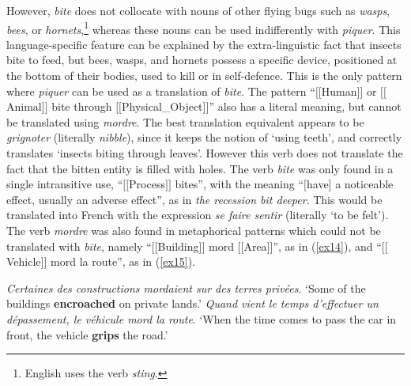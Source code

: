 \documentclass[output=paper]{langsci/langscibook}
\begin{document}
However, \textit{bite} does not collocate with nouns of other flying bugs such
as \textit{wasps}, \textit{bees}, or \textit{hornets},\footnote{English uses the verb \textit{sting}.}
whereas these nouns can be used indifferently with \textit{piquer}. This
language-specific feature can be explained by the extra-linguistic fact
that insects bite to feed, but bees, wasps, and hornets possess a
specific device, positioned at the bottom of their bodies, used to kill
or in self-defence. This is the only pattern where \textit{piquer} can be used
as a translation of \textit{bite}. The pattern “$[$$[$Human$]$$]$ or $[$$[$Animal$]$$]$ bite
through $[$$[$Physical\_Object$]$$]$” also has a literal meaning, but cannot be
translated using \textit{mordre}. The best translation equivalent appears to
be \textit{grignoter} (literally \textit{nibble}), since it keeps the notion of
`using teeth', and correctly translates `insects biting through
leaves'. However this verb does not translate the fact that the bitten
entity is filled with holes. The verb \textit{bite} was only found in a single
intransitive use, “$[$$[$Process$]$$]$ bites”, with the meaning “$[$have$]$ a
noticeable effect, usually an adverse effect”, as in \textit{the recession bit
deeper}. This would be translated into French with the expression \textit{se
faire sentir} (literally `to be felt'). The verb \textit{mordre} was also
found in metaphorical patterns which could not be translated with
\textit{bite}, namely “$[$$[$Building$]$$]$ mord $[$$[$Area$]$$]$”, as in (\ref{ex14}), and
“$[$$[$Vehicle$]$$]$ mord la route”, as in (\ref{ex15}).








\ea
\label{ex14}
\textit{Certaines des constructions mordaient sur des terres privées}.
\glt `Some of the buildings \textbf{encroached} on private lands.'
\ex \label{ex15}
\textit{Quand vient le temps d'effectuer un dépassement, le véhicule mord
la route}.
\glt `When the time comes to pass the car in front, the vehicle \textbf{grips} the road.'
\z
\end{document}
